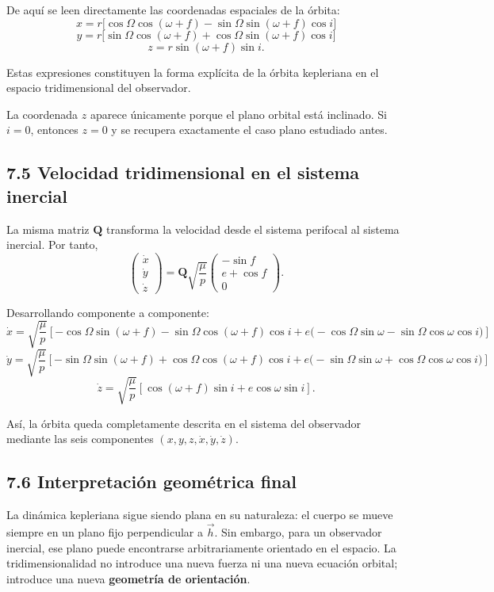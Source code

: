 De aquí se leen directamente las coordenadas espaciales de la órbita:
\[
 x = r\bigl[\cos\Omega\cos(\omega+f)-\sin\Omega\sin(\omega+f)\cos i\bigr]
\]
\[
 y = r\bigl[\sin\Omega\cos(\omega+f)+\cos\Omega\sin(\omega+f)\cos i\bigr]
\]
\[
 z = r\sin(\omega+f)\sin i.
\]

Estas expresiones constituyen la forma explícita de la órbita kepleriana en el espacio tridimensional del observador.

\begin{importante}
La coordenada \(z\) aparece únicamente porque el plano orbital está inclinado. Si \(i=0\), entonces \(z=0\) y se recupera exactamente el caso plano estudiado antes.
\end{importante}

\subsection*{7.5 Velocidad tridimensional en el sistema inercial}
La misma matriz \(\mathbf{Q}\) transforma la velocidad desde el sistema perifocal al sistema inercial. Por tanto,
\[
\begin{pmatrix}
 \dot{x} \\
 \dot{y} \\
 \dot{z}
\end{pmatrix}
=
\mathbf{Q}
\sqrt{\frac{\mu}{p}}
\begin{pmatrix}
 -\sin f \\
 e+\cos f \\
 0
\end{pmatrix}.
\]

Desarrollando componente a componente:
\[
\dot{x} = \sqrt{\frac{\mu}{p}}\left[-\cos\Omega\sin(\omega+f)-\sin\Omega\cos(\omega+f)\cos i + e\bigl(-\cos\Omega\sin\omega-\sin\Omega\cos\omega\cos i\bigr)\right]
\]
\[
\dot{y} = \sqrt{\frac{\mu}{p}}\left[-\sin\Omega\sin(\omega+f)+\cos\Omega\cos(\omega+f)\cos i + e\bigl(-\sin\Omega\sin\omega+\cos\Omega\cos\omega\cos i\bigr)\right]
\]
\[
\dot{z} = \sqrt{\frac{\mu}{p}}\left[\cos(\omega+f)\sin i + e\cos\omega\sin i\right].
\]

Así, la órbita queda completamente descrita en el sistema del observador mediante las seis componentes \((x,y,z,\dot{x},\dot{y},\dot{z})\).

\subsection*{7.6 Interpretación geométrica final}
La dinámica kepleriana sigue siendo plana en su naturaleza: el cuerpo se mueve siempre en un plano fijo perpendicular a \(\vec{h}\). Sin embargo, para un observador inercial, ese plano puede encontrarse arbitrariamente orientado en el espacio. La tridimensionalidad no introduce una nueva fuerza ni una nueva ecuación orbital; introduce una nueva \textbf{geometría de orientación}.

